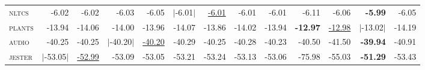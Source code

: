 \documentclass[14pt]{ffslides}
\begin{document}
{\begin{tabular}{l|rrrr|rrrr|rrrr}
\textsc{nltcs     } &   -6.02 &   -6.02 &   -6.03 &   -6.05 & $|$-6.01$|$ & \underline{-6.01} &   -6.01 &   -6.01 &   -6.11 &   -6.06 & \textbf{-5.99} &   -6.05\\
\textsc{plants    } &  -13.94 &  -14.06 &  -14.00 &  -13.96 &  -14.07 &  -13.86 &  -14.02 &  -13.94 & \textbf{-12.97} & \underline{-12.98} & $|$-13.02$|$ &  -14.19\\
\textsc{audio     } &   -40.25 &  -40.25 & $|$-40.20$|$ & \underline{-40.20} &  -40.29 &  -40.25 &  -40.28 &  -40.23 &  -40.50 &  -41.50 & \textbf{-39.94} &  -40.91\\
\textsc{jester    } & $|$-53.05$|$ & \underline{-52.99} &  -53.09 &  -53.05 &  -53.21 &  -53.24 &  -53.13 &  -53.06 &  -75.98 &  -55.03 & \textbf{-51.29} &  -53.43\\

\end{tabular}}
\end{document}
